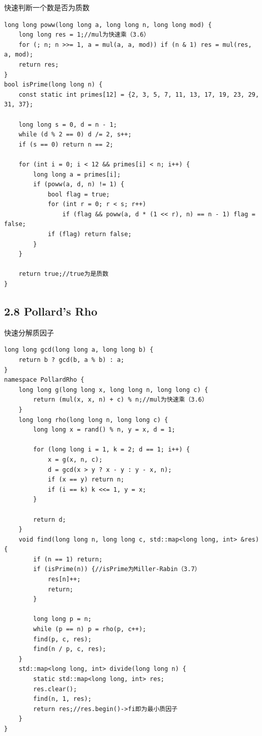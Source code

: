 \documentclass[11pt]{article}		%
\begin{document}
快速判断一个数是否为质数

\begin{verbatim}
long long poww(long long a, long long n, long long mod) {
    long long res = 1;//mul为快速乘（3.6）
    for (; n; n >>= 1, a = mul(a, a, mod)) if (n & 1) res = mul(res, a, mod);
    return res;
}
bool isPrime(long long n) {
    const static int primes[12] = {2, 3, 5, 7, 11, 13, 17, 19, 23, 29, 31, 37};

    long long s = 0, d = n - 1;
    while (d % 2 == 0) d /= 2, s++;
    if (s == 0) return n == 2;

    for (int i = 0; i < 12 && primes[i] < n; i++) {
        long long a = primes[i];
        if (poww(a, d, n) != 1) {
            bool flag = true;
            for (int r = 0; r < s; r++)
                if (flag && poww(a, d * (1 << r), n) == n - 1) flag = false;
            if (flag) return false;
        }
    }

    return true;//true为是质数
}
\end{verbatim}

\subsection{2.8 Pollard's Rho}\label{pollards-rho}

快速分解质因子

\begin{verbatim}
long long gcd(long long a, long long b) {
    return b ? gcd(b, a % b) : a;
}
namespace PollardRho {
    long long g(long long x, long long n, long long c) {
        return (mul(x, x, n) + c) % n;//mul为快速乘（3.6）
    }
    long long rho(long long n, long long c) {
        long long x = rand() % n, y = x, d = 1;

        for (long long i = 1, k = 2; d == 1; i++) {
            x = g(x, n, c);
            d = gcd(x > y ? x - y : y - x, n);
            if (x == y) return n;
            if (i == k) k <<= 1, y = x;
        }

        return d;
    }
    void find(long long n, long long c, std::map<long long, int> &res) {
        if (n == 1) return;
        if (isPrime(n)) {//isPrime为Miller-Rabin（3.7）
            res[n]++;
            return;
        }

        long long p = n;
        while (p == n) p = rho(p, c++);
        find(p, c, res);
        find(n / p, c, res);
    }
    std::map<long long, int> divide(long long n) {
        static std::map<long long, int> res;
        res.clear();
        find(n, 1, res);
        return res;//res.begin()->fi即为最小质因子
    }
}
\end{verbatim}
\end{document}
